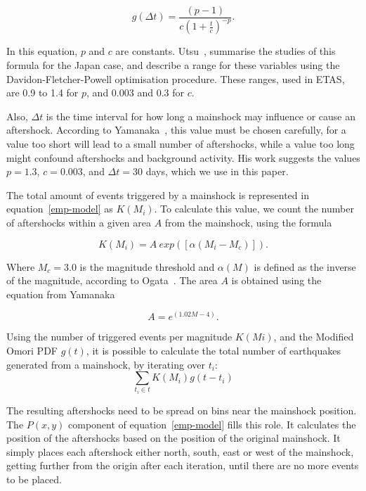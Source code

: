 \begin{equation}\label{omori}
  g(\Delta t)= \frac{(p-1)}{c(1+ \frac{t}{c})^{-p}}.
\end{equation}

In this equation, $p$ and $c$ are
constants. Utsu~\cite{utsu1995centenary}, summarise the studies of
this formula for the Japan case, and describe a range for these
variables using the Davidon-Fletcher-Powell optimisation
procedure. These ranges, used in ETAS, are 0.9 to 1.4 for $p$, and
0.003 and 0.3 for $c$.

Also, $\Delta t$ is the time interval for how long a mainshock may
influence or cause an aftershock. According to
Yamanaka~\cite{yamanaka1990scaling}, this value must be chosen
carefully, for a value too short will lead to a small number of
aftershocks, while a value too long might confound aftershocks and
background activity. His work suggests the values $p = 1.3$, $c =
0.003$, and $\Delta t = 30$ days, which we use in this paper.

The total amount of events triggered by a mainshock is represented in
equation~\ref{emp-model} as $K(M_i)$. To calculate this value,
we count the number of aftershocks within a given area $A$ from
the mainshock, using the formula

\begin{equation}\label{triggered}
 K(M_i) = A\ exp([\alpha(M_i-M_c)]).
\end{equation}

Where $M_c = 3.0$ is the magnitude threshold and $\alpha(M)$ is defined
as the inverse of the magnitude, according to
Ogata~\cite{ogata2006space}. The area $A$ is obtained using the
equation from Yamanaka~\cite{yamanaka1990scaling}

\begin{equation}
A = e^{(1.02M -4)}.
\end{equation}

Using the number of triggered events per magnitude $K(Mi)$, and the
Modified Omori PDF $g(t)$, it is possible to calculate the total
number of earthquakes generated from a mainshock, by iterating
over $t_i$:
\begin{equation}
\displaystyle\sum_{t_i \in t} K(M_i)g(t-t_i)
\end{equation}

The resulting aftershocks need to be spread on bins near the mainshock
position. The $P(x,y)$ component of equation~\ref{emp-model} fills
this role. It calculates the position of the aftershocks based on the
position of the original mainshock. It simply places each aftershock
either north, south, east or west of the mainshock, getting further
from the origin after each iteration, until there are no more events
to be placed.

